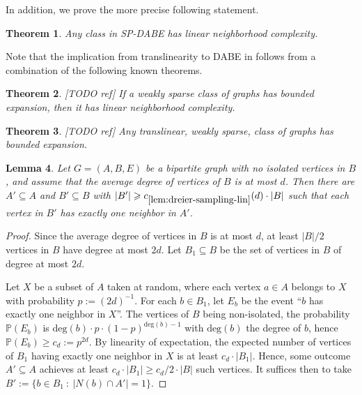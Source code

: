 \documentclass[11pt]{article}
\newtheorem{theorem}{Theorem}
\newtheorem{lemma}[theorem]{Lemma}
\theoremstyle{definition}
\renewcommand{\ge}{\geqslant}
\renewcommand{\subset}{\subseteq}
\begin{document}
In addition, we prove the more precise following statement.

\begin{theorem}\label{thm:main}
  Any class in SP-DABE has linear neighborhood complexity.
\end{theorem}

Note that the implication from translinearity to DABE in  follows from a combination of the following known theorems.

\begin{theorem}\label{thm:bddexp2nc}[TODO ref]
  If a weakly sparse class of graphs has bounded expansion, then it has linear neighborhood complexity.
\end{theorem}

\begin{theorem}\label{thm:sparsenc2bddexp}[TODO ref]
  Any translinear, weakly sparse, class of graphs has bounded expansion.
\end{theorem}

\begin{lemma}\label{lem:dreier-sampling-lin}
Let $G = (A, B, E)$ be a bipartite graph with no isolated vertices in $B$, and assume that the average degree of vertices of $B$ is at most $d$.
Then there are $A' \subseteq A$ and $B' \subseteq B$ with $|B'| \ge c_{\ref{lem:dreier-sampling-lin}}(d) \cdot |B|$ such that each vertex in $B'$ has exactly one neighbor in $A'$.
\end{lemma}
\begin{proof}
Since the average degree of vertices in $B$ is at most $d$, at least $|B|/2$ vertices in $B$ have degree at most $2d$.
Let $B_1 \subset B$ be the set of vertices in $B$ of degree at most $2d$.

Let $X$ be a subset of $A$ taken at random, where each vertex $a \in A$ belongs to $X$ with probability $p :=(2d)^{-1}$.
For each $b \in B_1$, let $E_b$ be the event ``$b$ has exactly one neighbor in $X$''.
The vertices of $B$ being non-isolated, the probability $\mathbb{P}(E_b)$ is $\text{deg}(b) \cdot p \cdot (1 - p)^{\text{deg}(b) - 1}$ with $\text{deg}(b)$ the degree of $b$, hence $\mathbb{P}(E_b) \ge c_d := p^{2d}$.
By linearity of expectation, the expected number of vertices of $B_1$ having exactly one neighbor in $X$ is at least $c_d \cdot |B_1|$.
Hence, some outcome $A' \subset A$ achieves at least $c_d \cdot |B_1| \ge c_d/2 \cdot |B|$ such vertices.
It suffices then to take $B' := \{b \in B_1 ~:~ |N(b) \cap A'| = 1\}$.
\end{proof}
\end{document}
